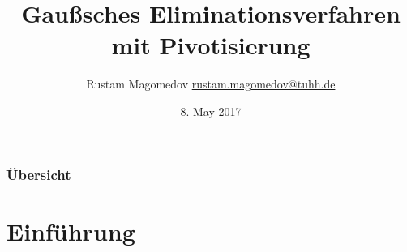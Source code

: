\documentclass[10pt]{beamer} %
\title[Pivotisierung]%
{Gaußsches Eliminationsverfahren mit Pivotisierung}
\author[Rustam Magomedov]%
{%
	{Rustam Magomedov}\break
  \footnotesize{\href{mailto:rustam.magomedov@tuhh.de}%
                {rustam.magomedov@tuhh.de}}%
}
\date[2017-05-08]{\footnotesize{8. May 2017}}
\begin{document}
\begin{frame}
  \titlepage
\end{frame}
\begin{frame}
  \frametitle{Übersicht}
  \tableofcontents[pausesections]
\end{frame}





\section{Einführung}
\end{document}
